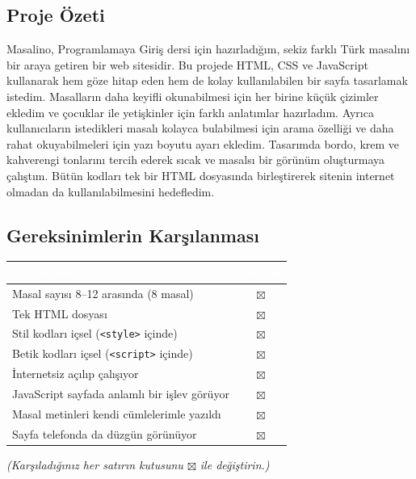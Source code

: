 \documentclass[12pt,a4paper]{article}
\newcommand{\aciklama}[1]{{\color{gray}\itshape (#1)}}
\begin{document}
\subsection{Proje Özeti}
Masalino, Programlamaya Giriş dersi için hazırladığım, sekiz farklı Türk masalını bir araya getiren bir web sitesidir. Bu projede HTML, CSS ve JavaScript kullanarak hem göze hitap eden hem de kolay kullanılabilen bir sayfa tasarlamak istedim. Masalların daha keyifli okunabilmesi için her birine küçük çizimler ekledim ve çocuklar ile yetişkinler için farklı anlatımlar hazırladım. Ayrıca kullanıcıların istedikleri masalı kolayca bulabilmesi için arama özelliği ve daha rahat okuyabilmeleri için yazı boyutu ayarı ekledim. Tasarımda bordo, krem ve kahverengi tonlarını tercih ederek sıcak ve masalsı bir görünüm oluşturmaya çalıştım. Bütün kodları tek bir HTML dosyasında birleştirerek sitenin internet olmadan da kullanılabilmesini hedefledim.

\subsection{Gereksinimlerin Karşılanması}
\begin{center}
\begin{tabular}{@{}p{8.2cm}c@{}}
\toprule
\rowcolor{ana}\textcolor{white}{\textbf{Gereksinim}} & \textcolor{white}{\textbf{Durum}} \\
\midrule
Masal sayısı 8--12 arasında (8 masal)         & $\boxtimes$ \\
Tek HTML dosyası                                    & $\boxtimes$ \\
Stil kodları içsel (\texttt{<style>} içinde)        & $\boxtimes$ \\
Betik kodları içsel (\texttt{<script>} içinde)      & $\boxtimes$ \\
İnternetsiz açılıp çalışıyor                        & $\boxtimes$ \\
JavaScript sayfada anlamlı bir işlev görüyor        & $\boxtimes$ \\
Masal metinleri kendi cümlelerimle yazıldı          & $\boxtimes$ \\
Sayfa telefonda da düzgün görünüyor                 & $\boxtimes$ \\
\bottomrule
\end{tabular}
\end{center}
\aciklama{Karşıladığınız her satırın kutusunu $\boxtimes$ ile değiştirin.}

\end{document}

